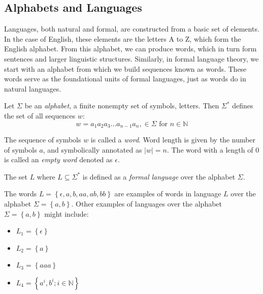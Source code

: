 \subsection{Alphabets and Languages}

Languages, both natural and formal, are constructed from a basic set of elements. In the case of English, these elements are the letters A to Z, which form the English alphabet. From this alphabet, we can produce words, which in turn form sentences and larger linguistic structures. Similarly, in formal language theory, we start with an alphabet from which we build sequences known as words. These words serve as the foundational units of formal languages, just as words do in natural languages.

\begin{definition}[Alphabet]
\label{def:alphabet}
Let $\Sigma$ be an \emph{alphabet}, a finite nonempty set of symbols, letters. Then $\Sigma ^{*}$ defines the set of all sequences $w$:
$$w= a_1 a_2 a_3 \dots a_{n-1} a_n, \in \Sigma \text{ for } n \in \mathbb{N}$$
\end{definition}

The sequence of symbols $w$ is called a \emph{word}. Word length is given by the number of symbols $a$, and symbolically annotated as $|w| = n$. The word with a length of 0 is called an \emph{empty word} denoted as $\epsilon$.

\begin{definition}[Language]
\label{def:language}
The set $L$ where $L\subseteq \Sigma^{*}$ is defined as a \emph{formal language} over the alphabet $\Sigma$. 
\end{definition}
The words $L = \left\lbrace \epsilon, a, b, aa, ab, bb \right\rbrace$ are examples of words in language $L$ over the alphabet $\Sigma=\left\lbrace a,b \right\rbrace$.
Other examples of languages over the alphabet $\Sigma=\left\lbrace a,b \right\rbrace$ might include:
\begin{itemize}
\item $L_1 = \left\lbrace \epsilon \right\rbrace$
\item $L_2 = \left\lbrace a \right\rbrace$
\item $L_3 = \left\lbrace aaa \right\rbrace$
\item $L_4 = \left\lbrace a^i,b^i; i \in \mathbb{N} \right\rbrace$
\end{itemize}




